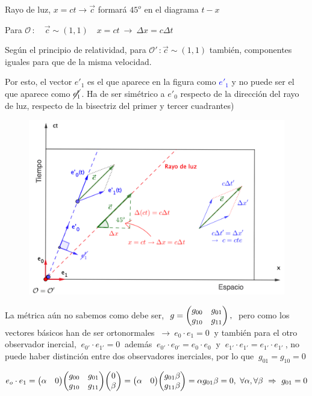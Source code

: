 Rayo de luz, $x=ct \to \vec c$ formará $45^o$ en el diagrama $t-x$	

Para $\mathcal O\,: \quad  \vec c \sim (1,1) \quad x=ct \ \to \ \Delta x=c\Delta t$

Según el principio de relatividad, para $\mathcal O'\,: \vec c \sim (1,1)$ también, componentes iguales para que de la misma velocidad.

Por esto, el vector $e'_1$ es el que aparece en la figura como  \textcolor{blue}{$e'_1$} y no puede ser el que aparece como \textcolor{blue}{$\cancel{e'_1}$}. Ha de ser simétrico a $e'_0$ respecto de la dirección del rayo de luz, respecto de la bisectriz del primer y tercer cuadrantes)
	
	
\begin{figure}[H]
	\centering
	\includegraphics[width=.95\textwidth]{imagenes/img30-06.png}
\end{figure}	
	
La métrica aún no sabemos como debe ser, $\ g=\mqty( g_{00} & g_{01} \\ g_{10} & g_{11} )\, , \  $ pero como los vectores básicos han de ser ortonormales $\ \to \ e_{0}\cdot e_{1}=0\ $ y también para el otro observador inercial, $\ e_{0'}\cdot e_{1'}=0\ $ además $\ e_{0'}\cdot e_{0'}=e_{0}\cdot e_{0} \ $ y  $\ e_{1'}\cdot e_{1'}=e_{1'}\cdot e_{1'}\ $, no puede haber distinción entre dos observadores inerciales, por lo que $\ g_{01}=g_{10}=0$
	
	
$e_o\cdot e_1=\mqty(\alpha & 0)\mqty( g_{00} & g_{01} \\ g_{10} & g_{11} )\mqty(0\\ \beta)=\mqty(\alpha & 0) \mqty(g_{01}\beta \\ g_{11} \beta)=\alpha g_{01} \beta = 0 ,\ \forall \alpha, \forall \beta \ \Rightarrow \ g_{01}=0 $
	
